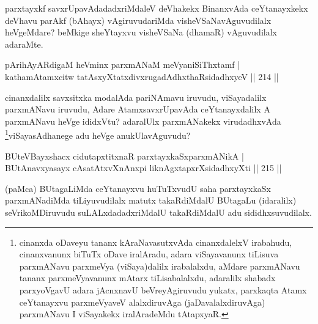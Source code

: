 \begin{artha}
parxtayxkf savxrUpavAdadadxriMdaleV deVhakekx BinanxvAda ceYtanayxkekx deVhavu parAkf (bAhayx) vAgiruvudariMda visheVSaNavAguvudilalx heVgeMdare? beMkige sheYtayxvu visheVSaNa (dhamaR) vAguvudilalx adaraMte.
\end{artha}


\begin{shl}
pArihAyARdigaM heVminx parxmANaM meVyaniSiThxtamf | \\
kathamAtamxcitw tatAsxyXtatxdivxrugadAdhxthaRsidadhxyeV \hfill ||  214 ||  
\end{shl}

\begin{artha}
cinanxdalilx savxsitxka modalAda pariNAmavu iruvudu, viSayadalilx parxmANavu iruvudu, Adare AtamxsavxrUpavAda ceYtanayxdalilx A parxmANavu heVge ididxVtu? adaralUlx parxmANakekx virudadhxvAda \footnote{cinanxda oDaveyu tananx kAraNavasutxvAda cinanxdalelxV irabahudu, cinanxvanunx biTuTx oDave iralAradu, adara viSayavanunx tiLisuva parxmANavu parxmeVya (viSaya)dalilx irabalalxdu, aMdare parxmANavu tananx parxmeVyavanunx mAtarx tiLisabalalxdu, adaralilx shabadx parxyoVgavU adara jAcnxnavU beVreyAgiruvudu yukatx, parxkaqta Atamx ceYtanayxvu parxmeVyaveV alalxdiruvAga (jaDavalalxdiruvAga) parxmANavu I viSayakekx iralAradeMdu tAtapxyaR.}viSayasAdhanege adu heVge anukUlavAguvudu?
\end{artha}


\begin{shl}
BUteVBayxshacx cidutapxtitxnaR parxtayxkaSxparxmANikA | \\
BUtAnavxyasayx cAsatAtxvXnAnxpi liknAgxtapxrXsidadhxyXti \hfill ||  215 ||  
\end{shl}

\begin{artha}
(paMca) BUtagaLiMda ceYtanayxvu huTuTxvudU saha parxtayxkaSx parxmANadiMda tiLiyuvudilalx matutx takaRdiMdalU BUtagaLu (idaralilx)  seVrikoMDiruvudu suLALxdadadxriMdalU takaRdiMdalU adu sididhxsuvudilalx.
\end{artha}



